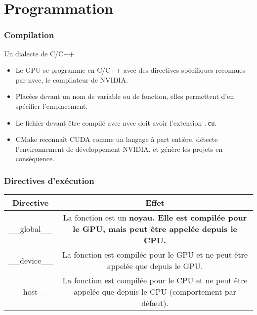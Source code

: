 \section{Programmation}
\begin{frame}
    \frametitle{Compilation}
\begin{block}{Un dialecte de C/C++}
    \begin{itemize}
        \item<+-> Le GPU se programme en C/C++ avec des directives spécifiques reconnues par nvcc, le 
        compilateur de NVIDIA.
        \item<+-> Placées devant un nom de variable ou de fonction, elles permettent d'en spécifier l'emplacement.
        \item<+-> Le fichier devant être compilé avec nvcc doit avoir l'extension \texttt{.cu}.
        \item<+-> CMake reconnaît CUDA comme un langage à part entière, détecte l'environnement de développement NVIDIA, et génère les projets en conséquence.
    \end{itemize}
\end{block}
\end{frame}
\begin{frame}
    \frametitle{Directives d'exécution}
    \renewcommand{\arraystretch}{2}
    \vskip 20pt
    \begin{tabular}{|c|c|}
        \hline
        \rowcolor{lightgray} Directive & Effet \\ \hline
        \_\_global\_\_ & \begin{minipage}{0.8\textwidth}
            La fonction est un \bf{noyau}. Elle est compilée pour le GPU, mais peut être appelée depuis le CPU. 
        \end{minipage} \\ \hline
        \_\_device\_\_ & \begin{minipage}{0.8\textwidth}
            La fonction est compilée pour le GPU et ne peut être appelée que depuis le GPU. 
        \end{minipage} \\ \hline
        \_\_host\_\_ & \begin{minipage}{0.8\textwidth}
            La fonction est compilée pour le CPU et ne peut être appelée que depuis le CPU (comportement par défaut). 
        \end{minipage} \\ \hline
    \end{tabular}

\end{frame}
